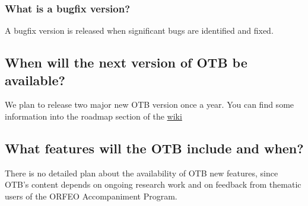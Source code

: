 \subsubsection{What is a bugfix version?}
A bugfix version is released when significant bugs are identified and fixed.

\subsection{When will the next version of OTB be available?}
We plan to release two major new OTB version once a year. You can find some information into the roadmap section of the \href{http://wiki.orfeo-toolbox.org/index.php/Main_Page}{wiki} 

\subsection{What features will the OTB include and when?}
There is no detailed plan about the availability of OTB new features,
since OTB's content depends on ongoing research work and on feedback
from thematic users of the ORFEO Accompaniment Program.

